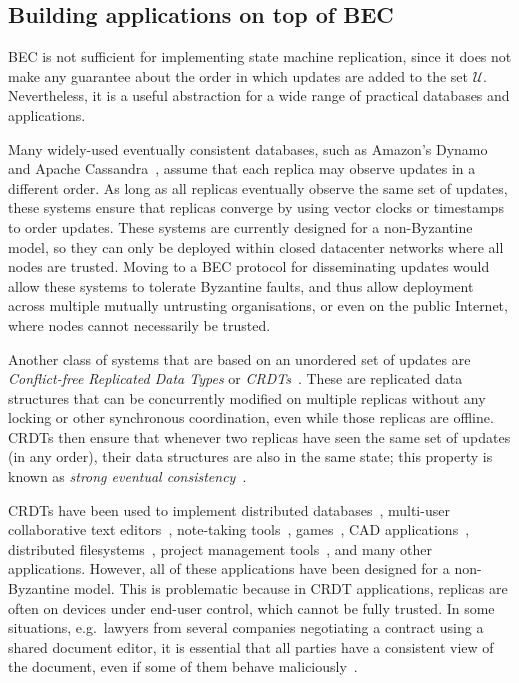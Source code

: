 \documentclass[a4paper,anonymous,USenglish]{lipics-v2019}
\begin{document}
\subsection{Building applications on top of BEC}\label{sec:applications}

BEC is not sufficient for implementing state machine replication, since it does not make any guarantee about the order in which updates are added to the set $\mathcal{U}$.
Nevertheless, it is a useful abstraction for a wide range of practical databases and applications.

Many widely-used eventually consistent databases, such as Amazon's Dynamo~\cite{DeCandia:2007ui} and Apache Cassandra~\cite{Lakshman:2009tz}, assume that each replica may observe updates in a different order.
As long as all replicas eventually observe the same set of updates, these systems ensure that replicas converge by using vector clocks or timestamps to order updates.
These systems are currently designed for a non-Byzantine model, so they can only be deployed within closed datacenter networks where all nodes are trusted.
Moving to a BEC protocol for disseminating updates would allow these systems to tolerate Byzantine faults, and thus allow deployment across multiple mutually untrusting organisations, or even on the public Internet, where nodes cannot necessarily be trusted.

Another class of systems that are based on an unordered set of updates are \emph{Conflict-free Replicated Data Types} or \emph{CRDTs}~\cite{Preguica:2018gi,Shapiro:2011}.
These are replicated data structures that can be concurrently modified on multiple replicas without any locking or other synchronous coordination, even while those replicas are offline.
CRDTs then ensure that whenever two replicas have seen the same set of updates (in any order), their data structures are also in the same state; this property is known as \emph{strong eventual consistency}~\cite{Gomes:2017gy,Shapiro:2011}.

CRDTs have been used to implement distributed databases~\cite{Akkoorath2016Cure,Brown2016bigsets,Zawirski2015SwiftCloud}, multi-user collaborative text editors~\cite{AhmedNacer:2011ke,Nedelec:2016eo,Weiss:2009ht}, note-taking tools~\cite{vanHardenberg2020PushPin}, games~\cite{vanderLinde:2017fu}, CAD applications~\cite{Lv:2018ie}, distributed filesystems~\cite{Najafzadeh:2018bw,Tao:2015gd}, project management tools~\cite{Kleppmann2019localfirst}, and many other applications.
However, all of these applications have been designed for a non-Byzantine model.
This is problematic because in CRDT applications, replicas are often on devices under end-user control, which cannot be fully trusted.
In some situations, e.g.\ lawyers from several companies negotiating a contract using a shared document editor, it is essential that all parties have a consistent view of the document, even if some of them behave maliciously~\cite{Kollmann:2019hf}.
\end{document}
